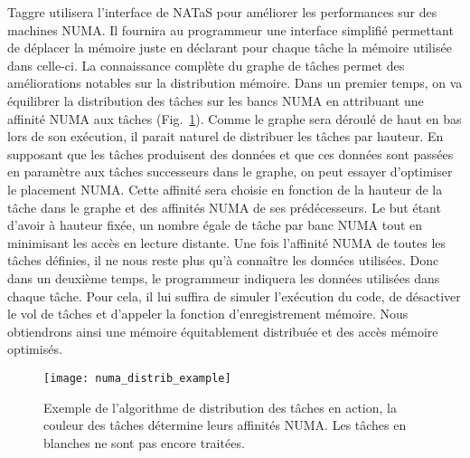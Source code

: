 Taggre utilisera l'interface de NATaS pour améliorer les performances sur des machines NUMA.
%
Il fournira au programmeur une interface simplifié permettant de déplacer la mémoire juste en déclarant pour chaque tâche la mémoire utilisée dans celle-ci.
%
La connaissance complète du graphe de tâches permet des améliorations notables sur la distribution mémoire.
%
Dans un premier temps, on va équilibrer la distribution des tâches sur les bancs NUMA en attribuant une affinité NUMA aux tâches (Fig.~\ref{fig:numa_distrib_example}).
%
Comme le graphe sera déroulé de haut en bas lors de son exécution, il parait naturel de distribuer les tâches par hauteur.
%
En supposant que les tâches produisent des données et que ces données sont passées en paramètre aux tâches successeurs dans le graphe, on peut essayer d'optimiser le placement NUMA.
%
Cette affinité sera choisie en fonction de la hauteur de la tâche dans le graphe et des affinités NUMA de ses prédécesseurs.
%
Le but étant d'avoir à hauteur fixée, un nombre égale de tâche par banc NUMA tout en minimisant les accès en lecture distante.
%
Une fois l'affinité NUMA de toutes les tâches définies, il ne nous reste plus qu'à connaître les données utilisées.
%
Donc dans un deuxième temps, le programmeur indiquera les données utilisées dans chaque tâche.
%
Pour cela, il lui suffira de simuler l'exécution du code, de désactiver le vol de tâches et d'appeler la fonction d'enregistrement mémoire.
%
Nous obtiendrons ainsi une mémoire équitablement distribuée et des accès mémoire optimisés.





\begin{figure}[!h]
  \centering
  \texttt{[image: numa\_distrib\_example]}
  \caption{Exemple de l'algorithme de distribution des tâches en action, la couleur des tâches détermine leurs affinités NUMA. Les tâches en blanches ne sont pas encore traitées.}
  \label{fig:numa_distrib_example}
\end{figure}
